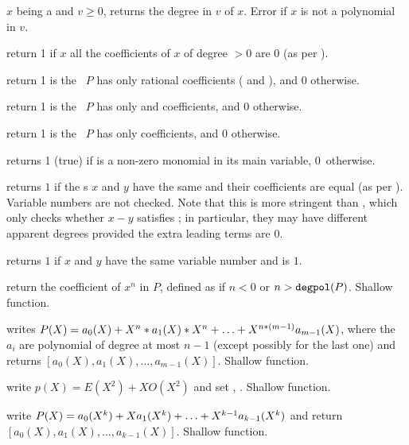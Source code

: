 
 $x$ being a  and $v \geq 0$,
returns the degree in $v$ of $x$. Error if $x$ is not a polynomial in $v$.

 return 1 if $x$ all the coefficients of
$x$ of degree $> 0$ are $0$ (as per ).

 return 1 is the ~$P$ has only
rational coefficients ( and ), and 0 otherwise.

 return 1 is the ~$P$ has only
 and  coefficients, and 0 otherwise.

 return 1 is the ~$P$ has only
 coefficients, and 0 otherwise.

 returns 1 (true) if  is a non-zero
monomial in its main variable, 0~otherwise.

 returns $1$ if the s $x$ and $y$
have the same  and their coefficients are equal (as per
). Variable numbers are not checked. Note that this is more
stringent than , which only checks whether $x - y$ satisfies
; in particular, they may have different apparent degrees provided
the extra leading terms are $0$.

 returns $1$ if $x$ and $y$
have the same variable number and  is $1$.


 return the coefficient of $x^n$ in $P$,
defined as  if $n < 0$ or $n > {\tt degpol}(P)$. Shallow
function.

 writes
$P(X)=a_0(X)+X^n*a_1(X)*X^n+\ldots+X^{n*(m-1)}\*a_{m-1}(X)$,
where the $a_i$ are polynomial of degree at most $n-1$
(except possibly for the last one) and returns
$[a_0(X),a_1(X),\ldots,a_{m-1}(X)]$.  Shallow function.

 write $p(X) = E(X^2) +
X O(X^2)$ and set , .  Shallow function.

 write
$P(X)=a_0(X^k)+X\*a_1(X^k)+\ldots+X^{k-1}\*a_{k-1}(X^k)$ and return
$[a_0(X),a_1(X),\ldots,a_{k-1}(X)]$.  Shallow function.


